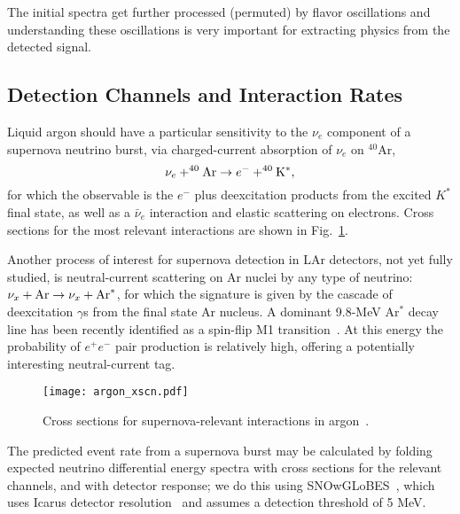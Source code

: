 The initial spectra get further processed (permuted) by flavor oscillations and understanding these oscillations is very important for extracting physics from the detected signal.


\subsection{Detection Channels and Interaction Rates}

Liquid argon should have a particular sensitivity to the $\nu_e$
component of a supernova neutrino burst, via charged-current
absorption of $\nu_e$ on $^{40}$Ar,
\begin{equation}
\nu_e + ^{40}{\rm Ar} \rightarrow e^- + ^{40}{\rm K^*},
\label{eq:nueabs}
\end{equation}
for which the observable is the $e^-$ plus deexcitation products from the excited $K^*$ final state, as well as a $\bar{\nu}_e$ interaction and elastic scattering on electrons.
Cross sections for the most
relevant interactions are shown in Fig.~\ref{fig:xscns}.

Another process of interest for supernova detection in LAr detectors, not yet fully studied,  is neutral-current  scattering on Ar nuclei by any type of neutrino: $\nu_x + {\rm Ar} \rightarrow \nu_x + {\rm Ar}^*$,  for which the signature is given by the cascade of deexcitation $\gamma$s from the final state Ar nucleus. A dominant 9.8-MeV Ar$^*$ decay line has been recently identified as a spin-flip M1 transition~\cite{Hayes}.   At this energy the probability of $e^+e^-$ pair production is relatively high, offering a potentially interesting neutral-current tag.


\begin{figure}[!htb]
\centering
\texttt{[image: argon\_xscn.pdf]}
\caption[]{Cross sections for supernova-relevant interactions in argon~\cite{GilBotella:2003sz,snowglobes}.}
\label{fig:xscns}
\end{figure}
%
The predicted event rate from a supernova burst may be calculated by
folding expected neutrino differential energy spectra with cross
sections for the relevant channels, and with detector response; we do this using SNOwGLoBES~\cite{snowglobes}, which uses Icarus detector resolution~\cite{Amoruso:2003sw} and assumes a detection threshold of 5 MeV.
%


